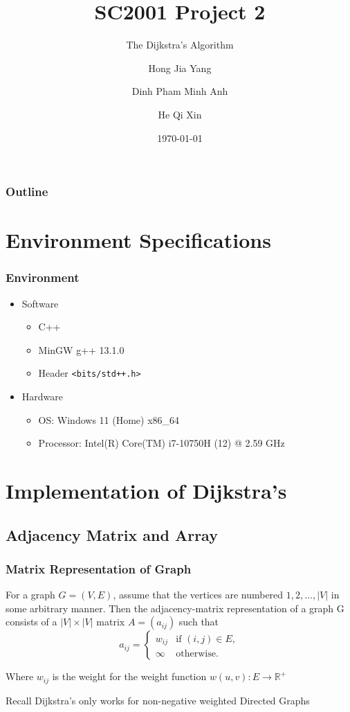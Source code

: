 \documentclass[a4paper]{beamer}
\title{SC2001 Project 2}
\subtitle{The Dijkstra's Algorithm}
\author[Hong, Dinh, He]{Hong Jia Yang \and Dinh Pham Minh Anh \and He Qi Xin}
\institute{Team 4}
\date{\today}
\begin{document}
\begin{frame}
	\titlepage
\end{frame}

\begin{frame}
	\frametitle{Outline}
	\tableofcontents
\end{frame}

\section{Environment Specifications}
\begin{frame}
	\frametitle{Environment}
	\begin{itemize}
		\item Software
		\begin{itemize}
			\item C++
			\item MinGW g++ 13.1.0	
			\item Header \texttt{<bits/std++.h>} 
		\end{itemize}
		\item Hardware
		\begin{itemize}
			\item OS: Windows 11 (Home) x86\_64
			\item Processor: Intel(R) Core(TM) i7-10750H (12) @ 2.59 GHz
		\end{itemize}	
	\end{itemize}
\end{frame}

\section{Implementation of Dijkstra's}
\subsection{Adjacency Matrix and Array}

\begin{frame}
	\frametitle{Matrix Representation of Graph}
	For a graph \( G = (V, E) \), assume that the vertices are numbered \( 1, 2, \hdots, \lvert{ V }\rvert  \) in some arbitrary manner. Then the adjacency-matrix representation of a graph G consists of a \( \lvert{ V }\rvert \times \lvert{ V }\rvert  \) matrix \( A = (a_{ij}) \) such that
	\[
		a_{ij} = \begin{cases}
			w_{ij} & \text{if } (i, j) \in E,\\
			\infty & \text{otherwise.} 
		\end{cases}
	\]

	Where \( w_{ij} \) is the weight for the weight function \( w(u, v) : E \rightarrow \mathbb{R}^+ \) 
	\onslide<2> \begin{block}{Recall}
		Dijkstra's only works for non-negative weighted Directed Graphs	
	\end{block}
\end{frame}
\end{document}
